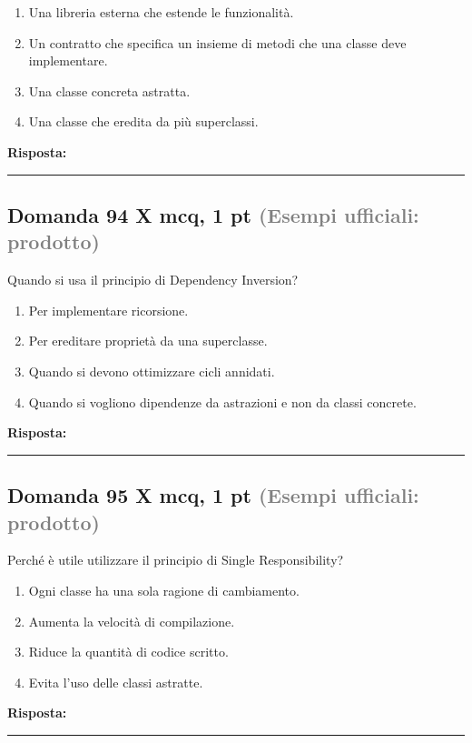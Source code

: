 \documentclass[a4paper,11pt]{article}
\begin{document}
\begin{enumerate}[label=\alph*)]
\item Una libreria esterna che estende le funzionalità.
\item Un contratto che specifica un insieme di metodi che una classe deve implementare.
\item Una classe concreta astratta.
\item Una classe che eredita da più superclassi.
\end{enumerate}
\vspace{0.2cm}
\noindent\textbf{Risposta:}\par
\vspace{1.5cm}\hrule


\subsection*{Domanda 94 X \hfill {\small mcq, 1 pt \textcolor{gray}{(Esempi ufficiali: prodotto)}}}
Quando si usa il principio di Dependency Inversion?

\begin{enumerate}[label=\alph*)]
\item Per implementare ricorsione.
\item Per ereditare proprietà da una superclasse.
\item Quando si devono ottimizzare cicli annidati.
\item Quando si vogliono dipendenze da astrazioni e non da classi concrete.
\end{enumerate}
\vspace{0.2cm}
\noindent\textbf{Risposta:}\par
\vspace{1.5cm}\hrule


\subsection*{Domanda 95 X \hfill {\small mcq, 1 pt \textcolor{gray}{(Esempi ufficiali: prodotto)}}}
Perché è utile utilizzare il principio di Single Responsibility?

\begin{enumerate}[label=\alph*)]
\item Ogni classe ha una sola ragione di cambiamento.
\item Aumenta la velocità di compilazione.
\item Riduce la quantità di codice scritto.
\item Evita l'uso delle classi astratte.
\end{enumerate}
\vspace{0.2cm}
\noindent\textbf{Risposta:}\par
\vspace{1.5cm}\hrule
\end{document}
